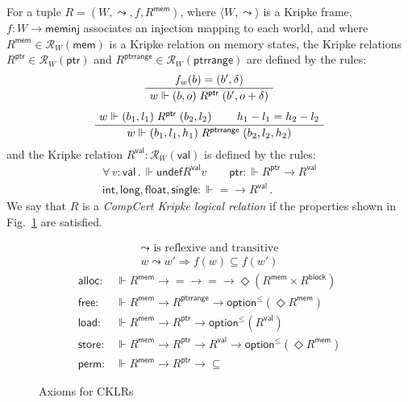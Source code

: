 \documentclass[sigplan,10pt,review,anonymous]{acmart}\settopmatter{printfolios=true,printccs=false,printacmref=false}
\newcommand{\kw}[1]{\ensuremath{ \mathsf{#1} }}
\begin{document}
\begin{definition} \label{def:cklr} %
For a tuple $R = (W, \leadsto, f, R^\kw{mem})$,
where
$\langle W, \leadsto \rangle$ is a Kripke frame,
$f : W \rightarrow \kw{meminj}$
associates an injection mapping to each world, and where
$R^\kw{mem} \in \mathcal{R}_{W}(\kw{mem})$
is a Kripke relation on memory states,
the Kripke relations
$R^\kw{ptr} \in \mathcal{R}_W(\kw{ptr})$ and
$R^\kw{ptrrange} \in \mathcal{R}_W(\kw{ptrrange})$
are defined by the rules:
\begin{gather*}
  \AxiomC{$f_w(b) = (b', \delta)$}
  \UnaryInfC{$w \Vdash (b, o) \mathrel{R^\kw{ptr}} (b', o + \delta)$}
  \DisplayProof
  \\[1ex]
  \AxiomC{$w \Vdash (b_1, l_1) \mathrel{R^\kw{ptr}} (b_2, l_2)$}
  \AxiomC{$h_1 - l_1 = h_2 - l_2$}
  \BinaryInfC{$w \Vdash (b_1, l_1, h_1) \mathrel{R^\kw{ptrrange}} (b_2, l_2, h_2)$}
  \DisplayProof
\end{gather*}
and the Kripke relation
$R^\kw{val} : \mathcal{R}_W(\kw{val})$
is defined by the rules:
\begin{gather*}
  \forall \, v : \kw{val} \,.\,
    \Vdash \kw{undef} \mathrel{R^\kw{val}} v \qquad
  \kw{ptr} : {\Vdash R^\kw{ptr} \rightarrow R^\kw{val}} \\
  \kw{int}, \kw{long}, \kw{float}, \kw{single} :
    {\Vdash {=} \rightarrow R^\kw{val}} \,.
\end{gather*}
We say that $R$ is a \emph{CompCert Kripke logical relation}
if the properties shown in Fig.~\ref{fig:cklr-def} are satisfied.
\end{definition}

\begin{figure} %
  \begin{gather*}
    {\leadsto} \mbox{ is reflexive and transitive} \\
    w \leadsto w' \Rightarrow f(w) \subseteq f(w')
  \end{gather*}
  \begin{align*}
      \kw{alloc} :
        &\Vdash R^\kw{mem} \rightarrow {=} \rightarrow {=} \rightarrow
        \Diamond (R^\kw{mem} \times R^\kw{block})
      \\
      \kw{free} :
        &\Vdash R^\kw{mem} \rightarrow R^\kw{ptrrange} \rightarrow
        \kw{option}^\le(\Diamond R^\kw{mem})
      \\
      \kw{load} :
        &\Vdash R^\kw{mem} \rightarrow R^\kw{ptr} \rightarrow
        \kw{option}^\le(R^\kw{val})
      \\
      \kw{store} :
        &\Vdash R^\kw{mem} \rightarrow R^\kw{ptr} \rightarrow R^\kw{val} \rightarrow
        \kw{option}^\le(\Diamond R^\kw{mem})
      \\
      \kw{perm} :
        &\Vdash R^\kw{mem} \rightarrow R^\kw{ptr} \rightarrow {\subseteq}
  \end{align*}
  \caption{Axioms for CKLRs}
  \label{fig:cklr-def}
\end{figure}
\end{document}
